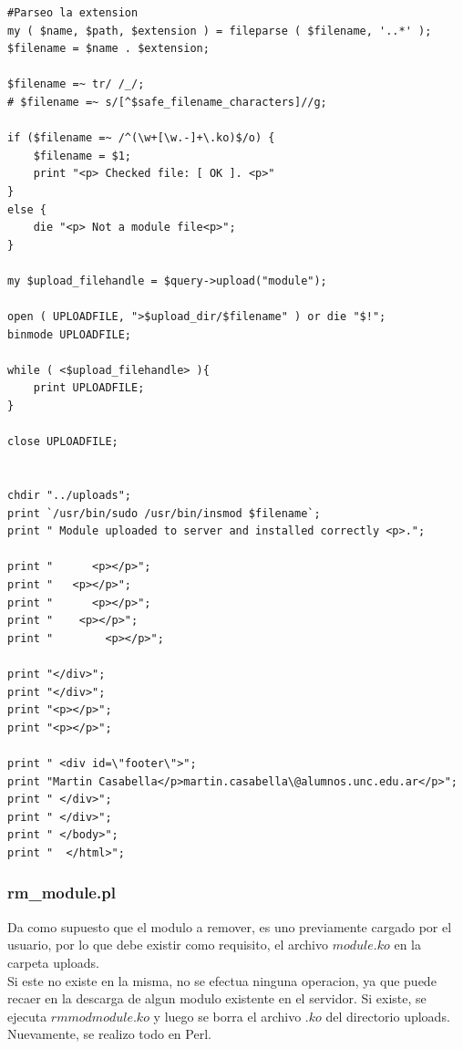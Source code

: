 \documentclass{article}
\begin{document}
\begin{lstlisting}[style=PerlStyle]
#Parseo la extension
my ( $name, $path, $extension ) = fileparse ( $filename, '..*' );
$filename = $name . $extension;

$filename =~ tr/ /_/;
# $filename =~ s/[^$safe_filename_characters]//g;

if ($filename =~ /^(\w+[\w.-]+\.ko)$/o) {
    $filename = $1;
    print "<p> Checked file: [ OK ]. <p>"
}
else {
    die "<p> Not a module file<p>";
}

my $upload_filehandle = $query->upload("module");

open ( UPLOADFILE, ">$upload_dir/$filename" ) or die "$!";
binmode UPLOADFILE;

while ( <$upload_filehandle> ){
    print UPLOADFILE;
}

close UPLOADFILE;


chdir "../uploads";
print `/usr/bin/sudo /usr/bin/insmod $filename`;
print " Module uploaded to server and installed correctly <p>.";

print "      <p></p>";
print "   <p></p>";
print "      <p></p>";
print "    <p></p>";
print "        <p></p>";

print "</div>";
print "</div>";
print "<p></p>";
print "<p></p>";

print " <div id=\"footer\">";
print "Martin Casabella</p>martin.casabella\@alumnos.unc.edu.ar</p>";
print " </div>";
print " </div>";
print " </body>";
print "  </html>";

\end{lstlisting}

\bigskip


\subsubsection{rm\_module.pl}

Da como supuesto que el modulo a remover, es uno previamente cargado por el usuario, por lo que debe existir como requisito, el archivo $module.ko$ en la carpeta uploads. \\

Si este no existe en la misma, no se efectua ninguna operacion, ya que puede recaer en la descarga de algun modulo existente en el servidor. Si existe, se ejecuta $rmmod module.ko$ y luego se borra el archivo $.ko$ del directorio uploads. Nuevamente, se realizo todo en Perl.\\
\end{document}
